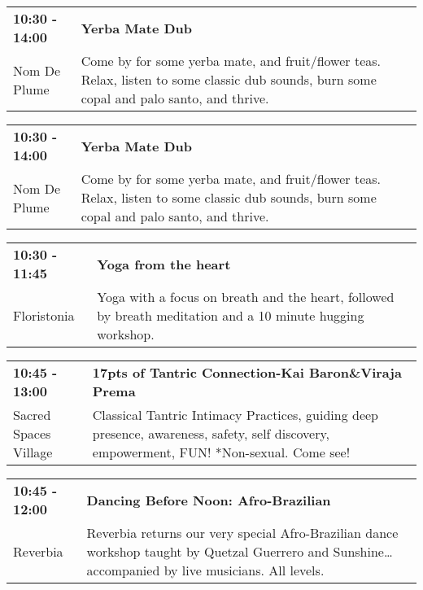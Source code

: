 \begin{tabular}{ p{1in} p{2.2in} }
    \textbf{10:30 - 14:00} & \textbf{Yerba Mate Dub} \\
    Nom De Plume \newline  & Come by for some yerba mate, and fruit/flower teas. Relax, listen to some classic dub sounds, burn some copal and palo santo, and thrive. \\
    \hline 
\end{tabular}
    
\begin{tabular}{ p{1in} p{2.2in} }
    \textbf{10:30 - 14:00} & \textbf{Yerba Mate Dub} \\
    Nom De Plume \newline  & Come by for some yerba mate, and fruit/flower teas. Relax, listen to some classic dub sounds, burn some copal and palo santo, and thrive. \\
    \hline 
\end{tabular}
    
\begin{tabular}{ p{1in} p{2.2in} }
    \textbf{10:30 - 11:45} & \textbf{Yoga from the heart} \\
    Floristonia \newline  & Yoga with a focus on breath and the heart, followed by breath meditation and a 10 minute hugging workshop. \\
    \hline 
\end{tabular}
    
\begin{tabular}{ p{1in} p{2.2in} }
    \textbf{10:45 - 13:00} & \textbf{17pts of Tantric Connection-Kai Baron\&Viraja Prema} \\
    Sacred Spaces Village \newline  & Classical Tantric Intimacy Practices, guiding deep presence, awareness, safety, self discovery, empowerment, FUN! *Non-sexual. Come see! \\
    \hline 
\end{tabular}
    
\begin{tabular}{ p{1in} p{2.2in} }
    \textbf{10:45 - 12:00} & \textbf{Dancing Before Noon: Afro-Brazilian} \\
    Reverbia \newline  & Reverbia returns our very special Afro-Brazilian dance workshop taught by Quetzal Guerrero and Sunshine\ldots accompanied by live musicians.  All levels. \\
    \hline 
\end{tabular}
    
